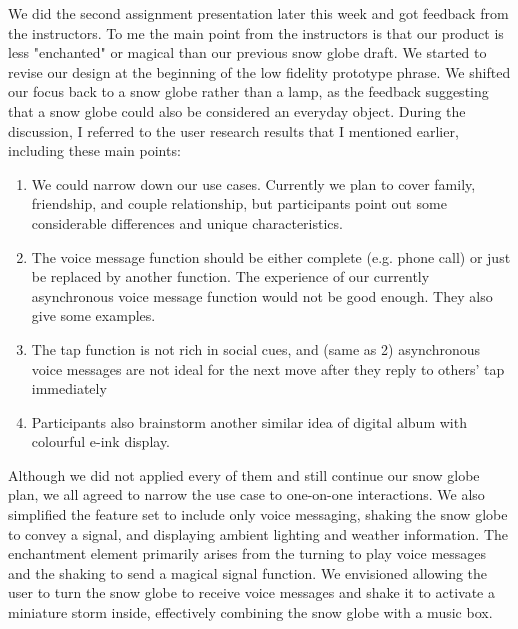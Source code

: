 We did the second assignment presentation later this week and got feedback from the instructors. To me the main point from the instructors is that our product is less "enchanted" or magical than our previous snow globe draft. We started to revise our design at the beginning of the low fidelity prototype phrase. We shifted our focus back to a snow globe rather than a lamp, as the feedback suggesting that a snow globe could also be considered an everyday object. During the discussion, I referred to the user research results that I mentioned earlier, including these main points: 
\begin{enumerate}
    \item We could narrow down our use cases. Currently we plan to cover family, friendship, and couple relationship, but participants point out some considerable differences and unique characteristics.
    \item The voice message function should be either complete (e.g. phone call) or just be replaced by another function. The experience of our currently asynchronous voice message function would not be good enough. They also give some examples.
    \item The tap function is not rich in social cues, and (same as 2) asynchronous voice messages are not ideal for the next move after they reply to others’ tap immediately
    \item Participants also brainstorm another similar idea of digital album with colourful e-ink display.
\end{enumerate}

Although we did not applied every of them and still continue our snow globe plan, we all agreed to narrow the use case to one-on-one interactions. We also simplified the feature set to include only voice messaging, shaking the snow globe to convey a signal, and displaying ambient lighting and weather information. The enchantment element primarily arises from the turning to play voice messages and the shaking to send a magical signal function. We envisioned allowing the user to turn the snow globe to receive voice messages and shake it to activate a miniature storm inside, effectively combining the snow globe with a music box.

